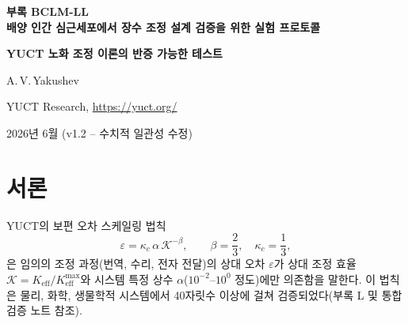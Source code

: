 \documentclass[12pt,a4paper]{article}
\newcommand{\REL}{\mathcal{K}}          %
\begin{document}
	
	\begin{titlepage}
		\centering
		\vspace*{2cm}
		{\Huge\bfseries 부록 BCLM-LL\\[0.3cm]
			배양 인간 심근세포에서 장수 조정 설계 검증을 위한 실험 프로토콜\par}
		\vspace{0.5cm}
		{\Large\bfseries YUCT 노화 조정 이론의 반증 가능한 테스트\par}
		\vspace{1.5cm}
		{\large A.\,V.\,Yakushev\par}
		{\normalsize YUCT Research, \url{https://yuct.org/}\par}
		\vspace{1.0cm}
		{\normalsize 2026년 6월 (v1.2 – 수치적 일관성 수정)}\par
		\vfill
		\begin{abstract}
			\noindent
			Yakushev 통일 조정 이론(YUCT)은 노화를 세포 하위 시스템의 조정 효율 \(K_{\mathrm{eff}}\)의 진행성 감소로 설명한다. 생물 조정 라그랑지안(BCLM, 부록 BCLM)은 서열 데이터로부터 \(K_{\mathrm{eff}}\)를 계산하고 이를 젊은 수준으로 회복시키는 유전적 개입을 설계하기 위한 수학적 프레임워크를 제공한다. 본 프로토콜은 배양 인간 심근세포에서 장수 조정 설계를 검증하기 위한 완전하고 자족적인 실험을 기술한다. 우리는 조작할 정확한 유전자를 명시하고, 그들의 자연형 및 최적화된 상대 조정 효율 \(\REL\)을 계산하며, 보편 오차 법칙 \(\varepsilon = \kappa_c \alpha \REL^{-\beta}\) (\(\beta=2/3\), \(\kappa_c=1/3\))으로부터 돌연변이율, 산화 스트레스, 단백질 응집, 이동 속도, 세포 수명에 대한 정량적 예측을 직접 도출하고, 단계별 실험 일정을 제공한다. 노화 표현형의 가역성을 입증하기 위해 제어 회귀 모듈(CCR)도 포함된다. 모든 예측은 사전 등록되었으며 표준 세포생물학 분석으로 반증 가능하다. 윤리적 이유로 프로토콜은 \textit{in vivo} 전달 방법을 의도적으로 생략했다. 독자는 부록~\(\Sigma\)를 참조하라.
		\end{abstract}
	\end{titlepage}
	
	\tableofcontents
	\newpage
	
	\section{서론}
	\label{sec:intro}
	YUCT의 보편 오차 스케일링 법칙
	\begin{equation}
		\varepsilon = \kappa_c \, \alpha \, \REL^{-\beta}, \qquad \beta = \frac{2}{3},\quad \kappa_c = \frac{1}{3},
		\label{eq:error-law}
	\end{equation}
	은 임의의 조정 과정(번역, 수리, 전자 전달)의 상대 오차 \(\varepsilon\)가 상대 조정 효율 \(\REL = K_{\mathrm{eff}}/K_{\mathrm{eff}}^{\max}\)와 시스템 특정 상수 \(\alpha\)(\(10^{-2}\)–\(10^{0}\) 정도)에만 의존함을 말한다. 이 법칙은 물리, 화학, 생물학적 시스템에서 40자릿수 이상에 걸쳐 검증되었다(부록 L 및 통합 검증 노트 참조).
	
\end{document}
